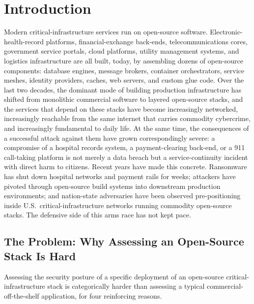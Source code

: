 \section{Introduction}
\label{sec:intro}

Modern critical-infrastructure services run on open-source software.
Electronic-health-record platforms, financial-exchange back-ends,
telecommunications cores, government service portals, cloud platforms,
utility management systems, and logistics infrastructure are all
built, today, by assembling dozens of open-source components: database
engines, message brokers, container orchestrators, service meshes,
identity providers, caches, web servers, and custom glue code. Over
the last two decades, the dominant mode of building production
infrastructure has shifted from monolithic commercial software to
layered open-source stacks, and the services that depend on these
stacks have become increasingly networked, increasingly reachable
from the same internet that carries commodity cybercrime, and
increasingly fundamental to daily life. At the same
time, the consequences of a successful attack against them have grown
correspondingly severe: a compromise of a hospital records system,
a payment-clearing back-end, or a 911 call-taking platform is not
merely a data breach but a service-continuity incident with direct
harm to citizens. Recent years have made this concrete.
Ransomware has shut down hospital networks and payment rails for
weeks; attackers have pivoted through open-source build systems into
downstream production environments; and nation-state adversaries have
been observed pre-positioning inside U.S.\ critical-infrastructure
networks running commodity open-source stacks. The defensive side of
this arms race has not kept pace.

\subsection{The Problem: Why Assessing an Open-Source Stack Is Hard}
\label{sec:intro-problem}

Assessing the security posture of a specific deployment of an
open-source critical-infrastructure stack is categorically harder than
assessing a typical commercial-off-the-shelf application, for four
reinforcing reasons.

